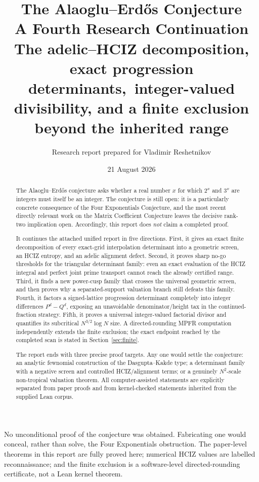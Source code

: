 \documentclass[11pt]{article}
\title{\textbf{The Alaoglu--Erd\H{o}s Conjecture}\\[0.4em]
\Large A Fourth Research Continuation\\[0.35em]
\large The adelic--HCIZ decomposition, exact progression determinants,\
integer-valued divisibility, and a finite exclusion beyond the inherited range}
\author{Research report prepared for Vladimir Reshetnikov}
\date{21 August 2026}
\newcommand{\1}{\mathbf 1}
\theoremstyle{plain}
\theoremstyle{definition}
\theoremstyle{remark}
\begin{document}
\maketitle

\begin{abstract}
The Alaoglu--Erd\H{o}s conjecture asks whether a real number $x$ for which
$2^x$ and $3^x$ are integers must itself be an integer.  The conjecture is
still open: it is a particularly concrete consequence of the Four
Exponentials Conjecture, and the most recent directly relevant work on the
Matrix Coefficient Conjecture leaves the decisive rank-two implication open.
Accordingly, this report does \emph{not} claim a completed proof.

It continues the attached unified report in five directions.  First, it gives
an exact finite decomposition of every exact-grid interpolation determinant
into a geometric screen, an HCIZ entropy, and an adelic alignment defect.
Second, it proves sharp no-go thresholds for the triangular determinant
family: even an exact evaluation of the HCIZ integral and perfect joint
prime transport cannot reach the already certified range.  Third, it finds a
new power-cusp family that crosses the universal geometric screen, and then
proves why a separated-support valuation branch still defeats this family.
Fourth, it factors a signed-lattice progression determinant completely into
integer differences $P^d-Q^d$, exposing an unavoidable denominator/height tax
in the continued-fraction strategy.  Fifth, it proves a universal
integer-valued factorial divisor and quantifies its subcritical
$N^{3/2}\log N$ size.  A directed-rounding MPFR computation independently
extends the finite exclusion; the exact endpoint reached by the completed
scan is stated in Section~\ref{sec:finite}.

The report ends with three precise proof targets.  Any one would settle the
conjecture: an analytic fewnomial construction of the Dasgupta--Kakde type; a
determinant family with a negative screen and controlled HCIZ/alignment
terms; or a genuinely $N^2$-scale non-tropical valuation theorem.  All
computer-assisted statements are explicitly separated from paper proofs and
from kernel-checked statements inherited from the supplied Lean corpus.
\end{abstract}

\begin{outcomebox}
No unconditional proof of the conjecture was obtained.  Fabricating one
would conceal, rather than solve, the Four Exponentials obstruction.  The
paper-level theorems in this report are fully proved here; numerical HCIZ
values are labelled reconnaissance; and the finite exclusion is a
software-level directed-rounding certificate, not a Lean kernel theorem.
\end{outcomebox}
\end{document}
